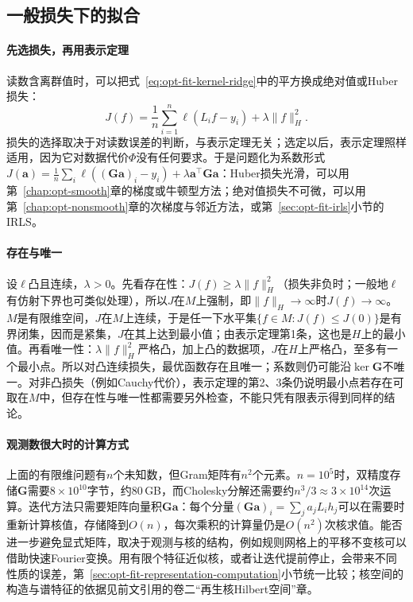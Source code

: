 \subsection{一般损失下的拟合}
\label{sec:opt-fit-general-loss}

\paragraph{先选损失，再用表示定理}
读数含离群值时，可以把式~\eqref{eq:opt-fit-kernel-ridge}中的平方换成绝对值或Huber损失：
\[
  J(f)=\frac1n\sum_{i=1}^n\ell(L_if-y_i)+\lambda\|f\|_H^2 .
\]
损失的选择取决于对读数误差的判断，与表示定理无关；选定以后，表示定理照样适用，因为它对数据代价$\Phi$没有任何要求。于是问题化为系数形式$J(\bm a)=\frac1n\sum_i\ell((\bm G\bm a)_i-y_i)+\lambda\bm a^\top\bm G\bm a$：Huber损失光滑，可以用第~\ref{chap:opt-smooth}章的梯度或牛顿型方法；绝对值损失不可微，可以用第~\ref{chap:opt-nonsmooth}章的次梯度与邻近方法，或第~\ref{sec:opt-fit-irls}小节的IRLS。

\paragraph{存在与唯一}
设$\ell$凸且连续，$\lambda>0$。先看存在性：$J(f)\ge\lambda\|f\|_H^2$（损失非负时；一般地$\ell$有仿射下界也可类似处理），所以$J$在$M$上强制，即$\|f\|_H\to\infty$时$J(f)\to\infty$。$M$是有限维空间，$J$在$M$上连续，于是任一下水平集$\{f\in M:J(f)\le J(0)\}$是有界闭集，因而是紧集，$J$在其上达到最小值；由表示定理第1条，这也是$H$上的最小值。再看唯一性：$\lambda\|f\|_H^2$严格凸，加上凸的数据项，$J$在$H$上严格凸，至多有一个最小点。所以对凸连续损失，最优函数存在且唯一；系数则仍可能沿$\ker\bm G$不唯一。对非凸损失（例如Cauchy代价），表示定理的第2、3条仍说明最小点若存在可取在$M$中，但存在性与唯一性都需要另外检查，不能只凭有限表示得到同样的结论。

\paragraph{观测数很大时的计算方式}
上面的有限维问题有$n$个未知数，但Gram矩阵有$n^2$个元素。$n=10^5$时，双精度存储$\bm G$需要$8\times10^{10}$字节，约$80$\,GB，而Cholesky分解还需要约$n^3/3\approx3\times10^{14}$次运算。迭代方法只需要矩阵向量积$\bm G\bm a$：每个分量$(\bm G\bm a)_i=\sum_ja_jL_ih_j$可以在需要时重新计算核值，存储降到$O(n)$，每次乘积的计算量仍是$O(n^2)$次核求值。能否进一步避免显式矩阵，取决于观测与核的结构，例如规则网格上的平移不变核可以借助快速Fourier变换。用有限个特征近似核，或者让迭代提前停止，会带来不同性质的误差，第~\ref{sec:opt-fit-representation-computation}小节统一比较；核空间的构造与谱特征的依据见前文引用的卷二“再生核Hilbert空间”章。

